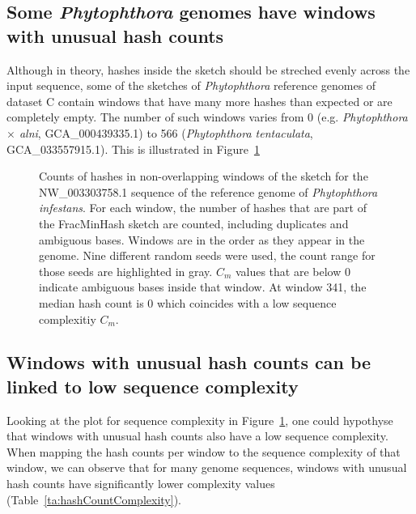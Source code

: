 \subsection*{Some \textit{Phytophthora} genomes have windows with unusual hash
counts} 

Although in theory, hashes inside the sketch should be streched evenly across
the input sequence, some of the sketches of \textit{Phytophthora} reference
genomes of dataset C contain windows that have many more hashes than expected or
are completely empty. The number of such windows varies from 0 (e.g.
\textit{Phytophthora $\times$  alni}, GCA\_000439335.1) to 566
(\textit{Phytophthora tentaculata}, GCA\_033557915.1). This is illustrated in
Figure~\ref{fig:sketchCountsOverview} 

\begin{figure}
  \centering
  
  \caption{Counts of hashes in non-overlapping windows of the sketch for the
   NW\_003303758.1 sequence of the reference genome of \textit{Phytophthora
   infestans}. For each window, the number of hashes that are part of the
   FracMinHash sketch are counted, including duplicates and ambiguous bases.
   Windows are in the order as they appear in the genome. Nine different random
   seeds were used, the count range for those seeds are highlighted in gray.
   $C_m$ values that are below $0$ indicate ambiguous bases inside that window.
   At window 341, the median hash count is $0$ which coincides with a low
   sequence complexitiy $C_m$.}
  \label{fig:sketchCountsOverview}
\end{figure}

\subsection*{Windows with unusual hash counts can be linked to low sequence complexity}
Looking at the plot for sequence complexity in
Figure~\ref{fig:sketchCountsOverview}, one could hypothyse that windows with
unusual hash counts also have a low sequence complexity. When mapping the hash
counts per window to the sequence complexity of that window, we can observe that
for many genome sequences, windows with unusual hash counts have significantly
lower complexity values (Table~\ref{ta:hashCountComplexity}).

